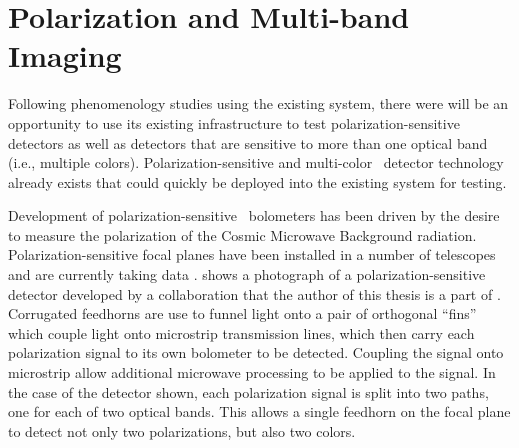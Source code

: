 \section{Polarization and Multi-band Imaging}

Following phenomenology studies using the existing system, there were will be an opportunity to use its existing infrastructure to test polarization-sensitive detectors as well as detectors that are sensitive to more than one optical band (i.e., multiple colors).
Polarization-sensitive and multi-color \TES\ detector technology already exists that could quickly be deployed into the existing system for testing.

Development of polarization-sensitive \TES\ bolometers has been driven by the desire to measure the polarization of the Cosmic Microwave Background radiation.
Polarization-sensitive focal planes have been installed in a number of telescopes and are currently taking data \cite{obrient_antenna-coupled_2012,austermann_sptpol:_2012,keating_ultra_2011,niemack_actpol:_2010,kusaka_modulation_2013}.
 shows a photograph of a polarization-sensitive detector developed by a collaboration that the author of this thesis is a part of \cite{datta_horn_2014}.
Corrugated feedhorns are use to funnel light onto a pair of orthogonal ``fins'' which couple light onto microstrip transmission lines, which then carry each polarization signal to its own bolometer to be detected.
Coupling the signal onto microstrip allow additional microwave processing to be applied to the signal.
In the case of the detector shown, each polarization signal is split into two paths, one for each of two optical bands.
This allows a single feedhorn on the focal plane to detect not only two polarizations, but also two colors.

